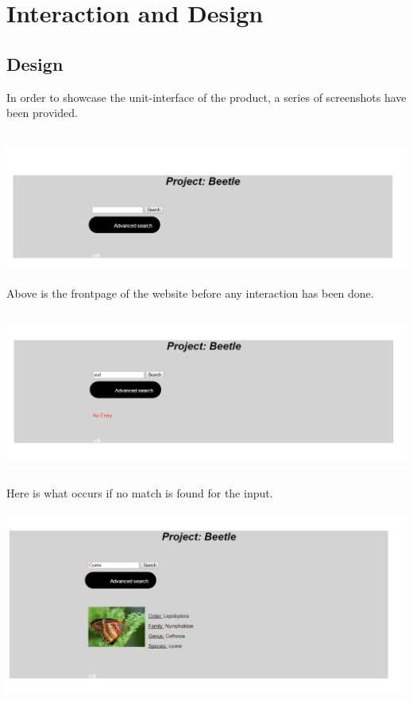 \documentclass[12pt,a4paper]{article}
\begin{document}
\section{Interaction and Design}
\subsection{Design}

In order to showcase the unit-interface of the product, a series of screenshots have been provided.

\includegraphics[height=50mm]{Prototype1.png}\\
Above is the frontpage of the website before any interaction has been done.\\
\includegraphics[height=60mm]{Prototype2.png}\\
Here is what occurs if no match is found for the input.\\
\includegraphics[height=70mm]{Prototype3.png}\\
\end{document}
